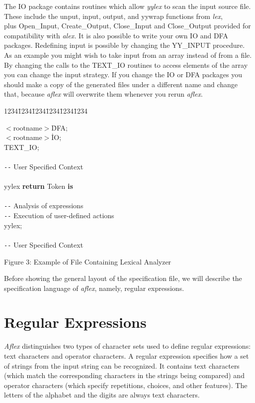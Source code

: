 \mysk
The IO package contains
routines which allow {\sl yylex} to scan the input source file.
These include the unput, input, output, and yywrap functions
from {\it lex},\\
plus Open\_Input, Create\_Output, Close\_Input and Close\_Output
provided for compatibility with {\sl alex.}
\mysk
It is also possible to write your own IO and DFA packages.  Redefining
input is possible by changing the YY\_INPUT procedure.  As an example
you might wish to take input from an array instead of from a file.  By
changing the calls to the TEXT\_IO routines to access elements of the
array you can change the input strategy.  If you change the IO or DFA
packages you should make a copy of the generated files under a
different name and change that, because {\sl aflex} will overwrite
them whenever you rerun {\sl aflex}.

\newpage
\small
\begin{tabbing}
1234\=1234\=1234\=1234\=1234\=1234 \kill

    \>\>     $<$rootname$>$\.DFA; \\
    \>\>     $<$rootname$>$\.IO; \\
    \>\>     TEXT\_IO; \\
\\
    \>\>    \>\verb|--| User Specified Context\\
\\
    \>\>    \>     yylex {\bf return} Token {\bf is} \\
    \>\>    \>     \\
    \>\>    \>    \>    \>\verb|--| Analysis of expressions \\
    \>\>    \>    \>    \>\verb|--| Execution of user-defined actions \\
    \>\>    \>     yylex; \\
\\
    \>\>  \>\verb|--| User Specified Context\\
\end{tabbing}
\centerline{Figure 3: Example of File Containing Lexical Analyzer}

\mysk
Before showing the general layout of the specification file, we will
describe the specification language of {\sl aflex}, namely, regular expressions.


\section{Regular Expressions}
{\sl Aflex} distinguishes two types  of  character  sets  used  to
define regular expressions: text characters and operator characters.
A regular expression specifies how a set of strings from the input
string can be recognized.  It contains text characters  (which  match  the
corresponding characters in  the  strings  being  compared)  and
operator  characters  (which  specify  repetitions, choices, and
other features).  The letters of the alphabet  and  the  digits  are
always text characters.

